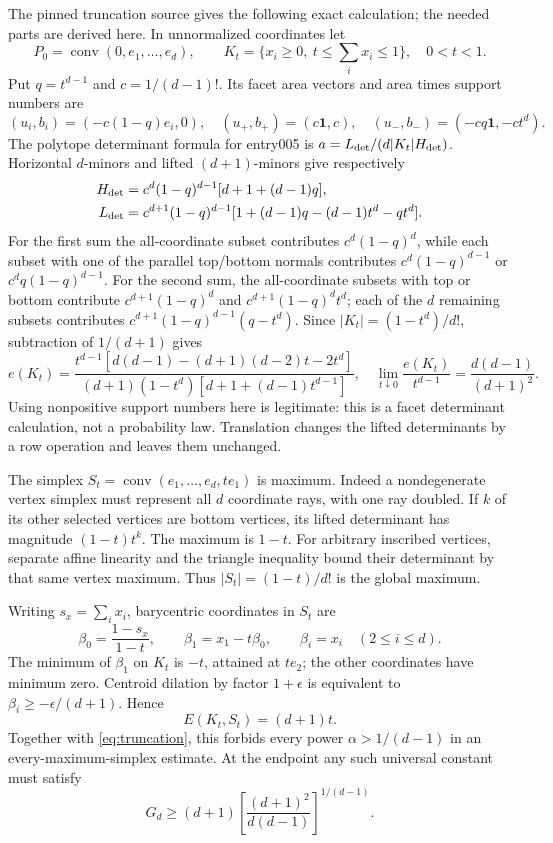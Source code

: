 \documentclass[11pt]{article}
\newcommand{\conv}{\operatorname{conv}}
\begin{document}
The pinned truncation source gives the following exact calculation;
the needed parts are derived here.
In unnormalized coordinates let
\[
 P_0=\conv(0,e_1,\ldots,e_d),\qquad
 K_t=\{x_i\ge0,\ t\le\textstyle\sum_i x_i\le1\},\quad 0<t<1.
\]
Put $q=t^{d-1}$ and $c=1/(d-1)!$.
Its facet area vectors and area times support numbers are
\[
 (u_i,b_i)=(-c(1-q)e_i,0),\quad
 (u_+,b_+)=(c\mathbf1,c),\quad
 (u_-,b_-)=(-cq\mathbf1,-ct^d).
\]
The polytope determinant formula for entry005 is
$a=L_{\rm det}/(d|K_t|H_{\rm det})$.
Horizontal $d$-minors and lifted $(d+1)$-minors give respectively
\begin{align*}
 H_{\rm det}
 &=c^d(1-q)^{d-1}[d+1+(d-1)q],\\
 L_{\rm det}
 &=c^{d+1}(1-q)^{d-1}
        [1+(d-1)q-(d-1)t^d-qt^d].
\end{align*}
For the first sum the all-coordinate subset contributes
$c^d(1-q)^d$, while each subset with one of the parallel top/bottom
normals contributes $c^d(1-q)^{d-1}$ or
$c^dq(1-q)^{d-1}$.
For the second sum, the all-coordinate subsets with top or bottom
contribute $c^{d+1}(1-q)^d$ and
$c^{d+1}(1-q)^dt^d$; each of the $d$ remaining subsets contributes
$c^{d+1}(1-q)^{d-1}(q-t^d)$.
Since $|K_t|=(1-t^d)/d!$, subtraction of $1/(d+1)$ gives
\begin{equation}\label{eq:truncation}
 e(K_t)=
 \frac{t^{d-1}[d(d-1)-(d+1)(d-2)t-2t^d]}
 {(d+1)(1-t^d)[d+1+(d-1)t^{d-1}]},
 \quad
 \lim_{t\downarrow0}\frac{e(K_t)}{t^{d-1}}
 =\frac{d(d-1)}{(d+1)^2}.
\end{equation}
Using nonpositive support numbers here is legitimate: this is a facet
determinant calculation, not a probability law. Translation changes
the lifted determinants by a row operation and leaves them unchanged.

The simplex $S_t=\conv(e_1,\ldots,e_d,te_1)$ is maximum.
Indeed a nondegenerate vertex simplex must represent all $d$ coordinate
rays, with one ray doubled. If $k$ of its other selected vertices are
bottom vertices, its lifted determinant has magnitude $(1-t)t^k$.
The maximum is $1-t$.
For arbitrary inscribed vertices, separate affine linearity and the
triangle inequality bound their determinant by that same vertex maximum.
Thus $|S_t|=(1-t)/d!$ is the global maximum.

Writing $s_x=\sum_i x_i$, barycentric coordinates in $S_t$ are
\[
 \beta_0=\frac{1-s_x}{1-t},\qquad
 \beta_1=x_1-t\beta_0,\qquad
 \beta_i=x_i\quad(2\le i\le d).
\]
The minimum of $\beta_1$ on $K_t$ is $-t$, attained at $te_2$;
the other coordinates have minimum zero.
Centroid dilation by factor $1+\epsilon$ is equivalent to
$\beta_i\ge-\epsilon/(d+1)$.
Hence
\[
 E(K_t,S_t)=(d+1)t.
\]
Together with \eqref{eq:truncation}, this forbids every power
$\alpha>1/(d-1)$ in an every-maximum-simplex estimate.
At the endpoint any such universal constant must satisfy
\[
 G_d\ge(d+1)
       \left[\frac{(d+1)^2}{d(d-1)}\right]^{1/(d-1)}.
\]
\end{document}
